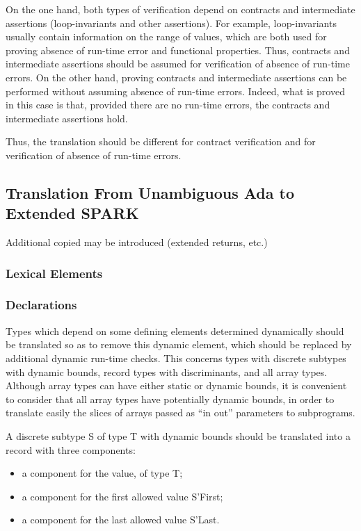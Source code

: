 \documentclass[fullpage]{article}
\newcounter{example}
\newcommand{\spark}{$\tau_S$}
\newcommand{\why}{$\tau_W$}
\begin{document}
On the one hand, both types of verification depend on contracts and
intermediate assertions (loop-invariants and other assertions). For example,
loop-invariants usually contain information on the range of values, which are
both used for proving absence of run-time error and functional
properties. Thus, contracts and intermediate assertions should be assumed for
verification of absence of run-time errors. On the other hand, proving
contracts and intermediate assertions can be performed without assuming absence
of run-time errors. Indeed, what is proved in this case is that, provided there
are no run-time errors, the contracts and intermediate assertions hold.

Thus, the translation should be different for contract verification and for
verification of absence of run-time errors. 


\subsection{Translation From Unambiguous Ada to Extended SPARK}

Additional copied may be introduced (extended returns, etc.)

\subsubsection{Lexical Elements}

\subsubsection{Declarations}



Types which depend on some defining elements determined dynamically should be
translated so as to remove this dynamic element, which should be replaced by
additional dynamic run-time checks. This concerns types with discrete subtypes
with dynamic bounds, record types with discriminants, and all array
types. Although array types can have either static or dynamic bounds, it is
convenient to consider that all array types have potentially dynamic bounds, in
order to translate easily the slices of arrays passed as ``in out'' parameters
to subprograms.

A discrete subtype S of type T with dynamic bounds should be translated into a
record with three components:
\begin{itemize}
\item a component for the value, of type T;
\item a component for the first allowed value S'First;
\item a component for the last allowed value S'Last.
\end{itemize}
\end{document}
